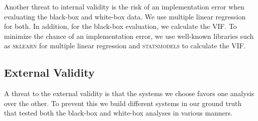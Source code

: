 Another threat to internal validity is the risk of an implementation error when evaluating the black-box and white-box data.
We use multiple linear regression for both. In addition, for the black-box evaluation, we calculate the \acs{VIF}.
To minimize the chance of an implementation error, we use well-known libraries such as \textsc{sklearn} for multiple linear regression and 
\textsc{statsmodels} to calculate the \acs{VIF}.

\subsection*{External Validity}
A threat to the external validity is that the systems we choose favors one analysis over the other.
To prevent this we build different systems in our ground truth that tested both the black-box and white-box analyses 
in various manners.